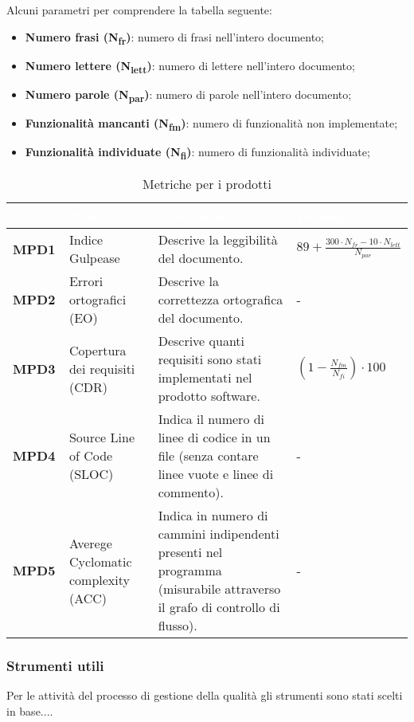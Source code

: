 Alcuni parametri per comprendere la tabella seguente:
\begin{itemize}
	\item \textbf{Numero frasi (N\textsubscript{fr})}: numero di frasi nell'intero documento;
	\item \textbf{Numero lettere (N\textsubscript{lett})}: numero di lettere nell'intero documento;
	\item \textbf{Numero parole (N\textsubscript{par})}: numero di parole nell'intero documento;
	\item \textbf{Funzionalità mancanti (N\textsubscript{fm})}: numero di funzionalità non implementate;
	\item \textbf{Funzionalità individuate (N\textsubscript{fi})}: numero di funzionalità individuate;
\end{itemize}

\renewcommand{\arraystretch}{1.5}
\renewcommand\extrarowheight{1.5pt}
\begin{longtable}{C{1.5cm} C{4.5cm} C{5.5cm} C{5cm}}
		\textcolor{white}{\textbf{Codice}} & 
		\textcolor{white}{\textbf{Nome}} & 
		\textcolor{white}{\textbf{Descrizione}} & 
		\textcolor{white}{\textbf{Formula}} \\
		\endfirsthead
	    \endfoot
	    \caption{Metriche per i prodotti}
	    \endlastfoot
		\hline
		\textbf{MPD1} & 
		Indice Gulpease & 
		Descrive la leggibilità del documento. & 
		$ 89 + \frac{300 \cdot N_{fr} - 10 \cdot N_{lett}}{N_{par}}$ \\
		\textbf{MPD2} & 
		Errori ortografici (EO) & 
		Descrive la correttezza ortografica del documento. & 
		- \\
		\textbf{MPD3} & 
		Copertura dei requisiti (CDR) & 
		Descrive quanti requisiti sono stati implementati nel prodotto software. &
		$(1 - \frac{N_{fm}}{N_{fi}}) \cdot 100 $ \\
		\textbf{MPD4} & 
		Source Line of Code (SLOC) & 
		Indica il numero di linee di codice in un file (senza contare linee vuote e linee di commento). &
		- \\
		\textbf{MPD5} & 
		Averege Cyclomatic complexity (ACC) & 
		Indica in numero di cammini indipendenti presenti nel programma (misurabile attraverso il grafo di controllo di flusso). &
		- \\
\end{longtable}

\subsubsection{Strumenti utili}
Per le attività del processo di gestione della qualità gli strumenti sono stati scelti in base.... 

 

  
